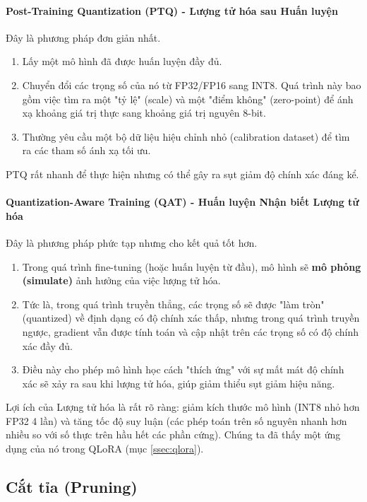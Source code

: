 \paragraph{Post-Training Quantization (PTQ) - Lượng tử hóa sau Huấn luyện}
Đây là phương pháp đơn giản nhất.
\begin{enumerate}
    \item Lấy một mô hình đã được huấn luyện đầy đủ.
    \item Chuyển đổi các trọng số của nó từ FP32/FP16 sang INT8. Quá trình này bao gồm việc tìm ra một "tỷ lệ" (scale) và một "điểm không" (zero-point) để ánh xạ khoảng giá trị thực sang khoảng giá trị nguyên 8-bit.
    \item Thường yêu cầu một bộ dữ liệu hiệu chỉnh nhỏ (calibration dataset) để tìm ra các tham số ánh xạ tối ưu.
\end{enumerate}
PTQ rất nhanh để thực hiện nhưng có thể gây ra sụt giảm độ chính xác đáng kể.

\paragraph{Quantization-Aware Training (QAT) - Huấn luyện Nhận biết Lượng tử hóa}
Đây là phương pháp phức tạp nhưng cho kết quả tốt hơn.
\begin{enumerate}
    \item Trong quá trình fine-tuning (hoặc huấn luyện từ đầu), mô hình sẽ \textbf{mô phỏng (simulate)} ảnh hưởng của việc lượng tử hóa.
    \item Tức là, trong quá trình truyền thẳng, các trọng số sẽ được "làm tròn" (quantized) về định dạng có độ chính xác thấp, nhưng trong quá trình truyền ngược, gradient vẫn được tính toán và cập nhật trên các trọng số có độ chính xác đầy đủ.
    \item Điều này cho phép mô hình học cách "thích ứng" với sự mất mát độ chính xác sẽ xảy ra sau khi lượng tử hóa, giúp giảm thiểu sụt giảm hiệu năng.
\end{enumerate}

Lợi ích của Lượng tử hóa là rất rõ ràng: giảm kích thước mô hình (INT8 nhỏ hơn FP32 4 lần) và tăng tốc độ suy luận (các phép toán trên số nguyên nhanh hơn nhiều so với số thực trên hầu hết các phần cứng). Chúng ta đã thấy một ứng dụng của nó trong QLoRA (mục \ref{ssec:qlora}).

\subsection{Cắt tỉa (Pruning)}
\label{ssec:pruning}

